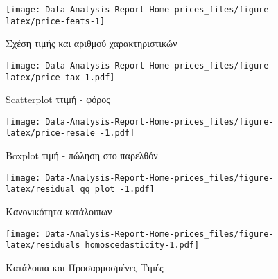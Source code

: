 \documentclass[
  10pt,
]{article}
\begin{document}
\begin{figure}

{\centering \texttt{[image: Data-Analysis-Report-Home-prices\_files/figure-latex/price-feats-1]} 

}

\caption{Σχέση τιμής και αριθμού χαρακτηριστικών}\label{fig:price-feats}
\end{figure}

\begin{figure}
\centering
\texttt{[image: Data-Analysis-Report-Home-prices\_files/figure-latex/price-tax-1.pdf]}
\caption{Scatterplot ττιμή - φόρος}
\end{figure}

\begin{figure}
\centering
\texttt{[image: Data-Analysis-Report-Home-prices\_files/figure-latex/price-resale -1.pdf]}
\caption{Boxplot τιμή - πώληση στο παρελθόν}
\end{figure}

\begin{figure}
\centering
\texttt{[image: Data-Analysis-Report-Home-prices\_files/figure-latex/residual qq plot -1.pdf]}
\caption{Κανονικότητα κατάλοιπων}
\end{figure}

\begin{figure}
\centering
\texttt{[image: Data-Analysis-Report-Home-prices\_files/figure-latex/residuals homoscedasticity-1.pdf]}
\caption{Κατάλοιπα και Προσαρμοσμένες Τιμές}
\end{figure}
\end{document}
